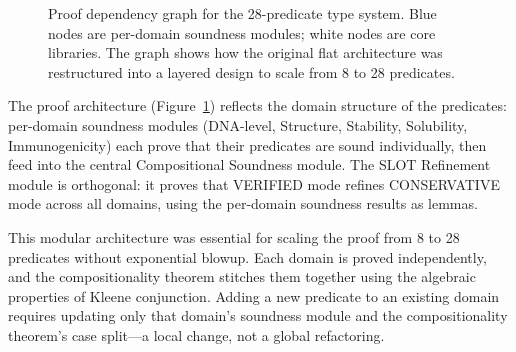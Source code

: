 \begin{figure}[t]
\centering
{}
\caption{Proof dependency graph for the 28-predicate type system.
         Blue nodes are per-domain soundness modules; white nodes are
         core libraries. The graph shows how the original flat
         architecture was restructured into a layered design to
         scale from 8 to 28 predicates.}
\label{fig:proofdep}
\end{figure}

The proof architecture (Figure~\ref{fig:proofdep}) reflects the
domain structure of the predicates: per-domain soundness modules
(DNA-level, Structure, Stability, Solubility, Immunogenicity) each
prove that their predicates are sound individually, then feed into
the central Compositional Soundness module.
The SLOT Refinement module is orthogonal: it proves that VERIFIED
mode refines CONSERVATIVE mode across all domains, using the
per-domain soundness results as lemmas.

This modular architecture was essential for scaling the proof from 8
to 28 predicates without exponential blowup.
Each domain is proved independently, and the compositionality theorem
stitches them together using the algebraic properties of Kleene
conjunction.
Adding a new predicate to an existing domain requires updating only
that domain's soundness module and the compositionality theorem's
case split---a local change, not a global refactoring.
